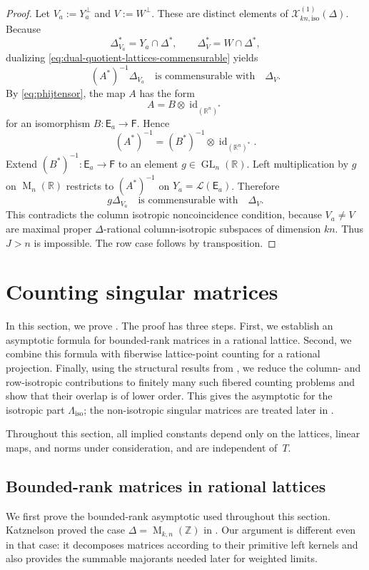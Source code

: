 \documentclass[reqno,11pt]{amsart}
\numberwithin{equation}{section}
\theoremstyle{definition}
\theoremstyle{remark}
\newcommand{\op}{\operatorname}
\newcommand{\R}{\mathbb R}
\newcommand{\M}{\op{M}}
\newcommand{\id}{\op{id}}
\newcommand{\GL}{\op{GL}}
\begin{document}
\begin{proof}
Let $V_a:=Y_a^\perp$ and $V:=W^\perp$. These are distinct elements of
$\mathcal X^{(1)}_{kn,\mathrm{iso}}(\Delta)$. Because
$$
\Delta_{V_a}^*=Y_a\cap\Delta^*,
\qquad
\Delta_V^*=W\cap\Delta^*,
$$ dualizing \eqref{eq:dual-quotient-lattices-commensurable} yields
$$
(A^*)^{-1}\Delta_{V_a}
\quad\text{is commensurable with}\quad
\Delta_V.
$$
By \eqref{eq:phijtensor}, the map $A$ has the form
$$
A=B\otimes\id_{(\R^n)^*}
$$
for an isomorphism $B:\mathsf E_a\to \mathsf F$. Hence
$$
(A^*)^{-1}=(B^*)^{-1}\otimes\id_{(\R^n)^*}.
$$
Extend $(B^*)^{-1}:\mathsf E_a\to \mathsf F$ to an element $g\in\GL_n(\R)$. Left
multiplication by $g$ on $\M_n(\R)$ restricts to $(A^*)^{-1}$ on
$Y_a=\mathcal{L}(\mathsf E_a)$. Therefore
$$
g\Delta_{V_a}
\quad\text{is commensurable with}\quad
\Delta_V.
$$
This contradicts the column isotropic noncoincidence condition, because $V_a\ne V$ are
maximal proper $\Delta$-rational column-isotropic subspaces of dimension
$kn$. Thus $J>n$ is impossible. The row case follows by transposition.
\end{proof}


\section{Counting singular matrices}
\label{s:isotropic}

In this section, we prove . The proof has
three steps. First, we establish an asymptotic formula for bounded-rank
matrices in a rational lattice. Second, we combine this formula with
fiberwise lattice-point counting for a rational projection. Finally,
using the structural results from , we reduce the column-
and row-isotropic contributions to finitely many such fibered counting
problems and show that their overlap is of lower order. This gives the
asymptotic for the isotropic part $\Lambda_{\operatorname{iso}}$; the
non-isotropic singular matrices are treated later in
.


Throughout this section, all implied constants depend only on the lattices,
linear maps, and norms under consideration, and are independent of~$T$.


\subsection{Bounded-rank matrices in rational lattices}
We first prove the bounded-rank asymptotic used throughout this section.
Katznelson proved the case
$\Delta=\M_{k,n}(\mathbb Z)$ in \cite{katznelson:1994}. Our argument is
different even in that case: it decomposes matrices according to their
primitive left kernels and also provides the summable majorants needed
later for weighted limits.
\end{document}
